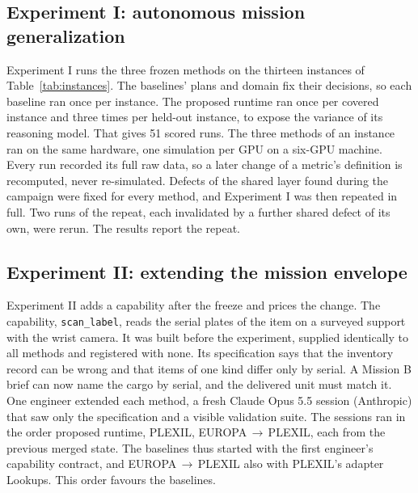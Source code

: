\subsection{Experiment I: autonomous mission generalization}
\label{sec:setup-exp1}

Experiment I runs the three frozen methods on the thirteen instances of Table~\ref{tab:instances}. The baselines' plans
and domain fix their decisions, so each baseline ran once per instance. The proposed runtime ran once per covered
instance and three times per held-out instance, to expose the variance of its reasoning model. That gives 51 scored runs.
The three methods of an instance ran on the same hardware, one simulation per GPU on a six-GPU machine. Every run
recorded its full raw data, so a later change of a metric's definition is recomputed, never re-simulated. Defects of the
shared layer found during the campaign were fixed for every method, and Experiment I was then repeated in full. Two runs
of the repeat, each invalidated by a further shared defect of its own, were rerun. The results report the repeat.

\subsection{Experiment II: extending the mission envelope}
\label{sec:setup-exp2}

Experiment II adds a capability after the freeze and prices the change. The capability, \texttt{scan\_label}, reads the
serial plates of the item on a surveyed support with the wrist camera. It was built before the experiment, supplied
identically to all methods and registered with none. Its specification says that the inventory record can be wrong and
that items of one kind differ only by serial. A Mission B brief can now name the cargo by serial, and the delivered unit
must match it. One engineer extended each method, a fresh Claude Opus 5.5 session (Anthropic) that saw only the
specification and a visible validation suite. The sessions ran in the order proposed runtime, PLEXIL,
EUROPA\,$\rightarrow$\,PLEXIL, each from the previous merged state. The baselines thus started with the first engineer's
capability contract, and EUROPA\,$\rightarrow$\,PLEXIL also with PLEXIL's adapter Lookups. This order favours the
baselines.

